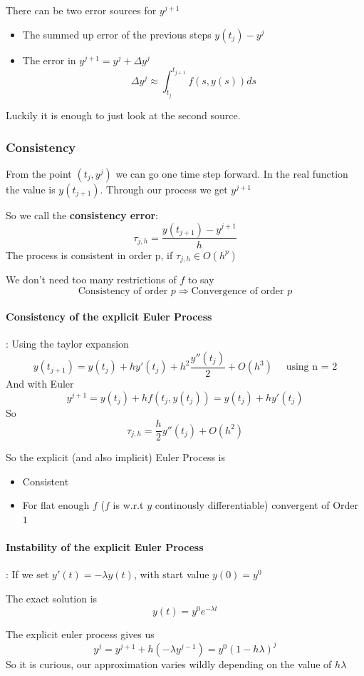 \documentclass{article}
\begin{document}
There can be two error sources for $y^{j+1}$
\begin{itemize}
  \item The summed up error of the previous steps $y(t_j) - y^j$
  \item The error in $y^{j+1} = y^j + \Delta y^j$
  \[\Delta y^j \approx \int_{t_j}^{t_{j+1}}f(s,y(s))ds\]
\end{itemize}
Luckily it is enough to just look at the second source.

\subsubsection{Consistency}
From the point $(t_j,y^j)$ we can go one time step forward. In the real function the value is $y(t_{j+1})$. Through our process we get $y^{j+1}$

So we call the \textbf{consistency error}:
\[\tau_{j,h} = \frac{y(t_{j+1}) - y^{j+1}}{h}\]
The process is consistent in order p, if $\tau_{j,h} \in O(h^p)$

We don't need too many restrictions of $f$ to say
\[\text{Consistency of order } p \Rightarrow \text{Convergence of order }p\]

\paragraph{Consistency of the explicit Euler Process}: Using the taylor expansion
\[y(t_{j+1}) = y(t_j) + hy'(t_j) + h^2\frac{y''(t_j)}{2} + O(h^3) \quad \text{ using n = 2}\] 
And with Euler
\[y^{j+1} = y(t_j) + hf(t_j,y(t_j)) = y(t_j) + hy'(t_j)\]
So
\[\tau_{j,h} = \frac{h}{2}y''(t_j) + O(h^2)\]

So the explicit (and also implicit) Euler Process is 
\begin{itemize}
  \item Consistent
  \item For flat enough $f$ ($f$ is w.r.t $y$ continously differentiable) convergent of Order $1$
\end{itemize}

\paragraph{Instability of the explicit Euler Process}: 
If we set $y'(t) = -\lambda y(t)$, with start value $y(0) = y^0$

The exact solution is
\[y(t)= y^0 e^{-\lambda t}\]

The explicit euler process gives us
\[y^{j} = y^{j+1} + h (-\lambda y^{j-1}) = y^0 (1-h\lambda)^j\]
So it is curious, our approximation varies wildly depending on the value of $h\lambda$
\end{document}
